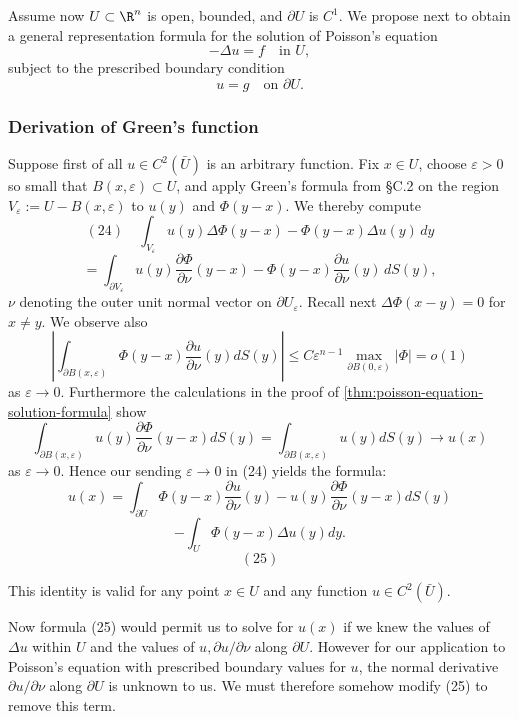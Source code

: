 Assume now $U \subset \R^n$ is open, bounded, and $\partial U$ is $C^1$. We propose next to obtain a general representation formula for the solution of Poisson's equation
$$-\Delta u = f \quad \text{in } U,$$
subject to the prescribed boundary condition
$$u = g \quad \text{on } \partial U.$$

\subsubsection{Derivation of Green's function}
\label{sec:laplace-greens-function-derivation}

Suppose first of all $u \in C^2(\bar{U})$ is an arbitrary function. Fix $x \in U$, choose $\varepsilon > 0$ so small that $B(x, \varepsilon) \subset U$, and apply Green's formula from \S C.2 on the region $V_\varepsilon := U - B(x, \varepsilon)$ to $u(y)$ and $\Phi(y - x)$. We thereby compute
$$(24) \quad \int_{V_\varepsilon} u(y) \Delta \Phi(y - x) - \Phi(y - x) \Delta u(y) \, dy$$
$$= \int_{\partial V_\varepsilon} u(y) \frac{\partial \Phi}{\partial \nu}(y - x) - \Phi(y - x) \frac{\partial u}{\partial \nu}(y) \, dS(y),$$
$\nu$ denoting the outer unit normal vector on $\partial U_\varepsilon$. Recall next $\Delta \Phi(x - y) = 0$ for $x \neq y$. We observe also
$$\left|\int_{\partial B(x,\varepsilon)} \Phi(y - x) \frac{\partial u}{\partial \nu}(y) dS(y)\right| \leq C\varepsilon^{n-1} \max_{\partial B(0,\varepsilon)} |\Phi| = o(1)$$
as $\varepsilon \to 0$. Furthermore the calculations in the proof of \cref{thm:poisson-equation-solution-formula} show
$$\int_{\partial B(x,\varepsilon)} u(y) \frac{\partial \Phi}{\partial \nu}(y - x) dS(y) = \int_{\partial B(x,\varepsilon)} u(y) dS(y) \to u(x)$$
as $\varepsilon \to 0$. Hence our sending $\varepsilon \to 0$ in (24) yields the formula:
$$u(x) = \int_{\partial U} \Phi(y - x) \frac{\partial u}{\partial \nu}(y) - u(y) \frac{\partial \Phi}{\partial \nu}(y - x) dS(y)$$
$$- \int_U \Phi(y - x) \Delta u(y) dy.$$
$$(25)$$

This identity is valid for any point $x \in U$ and any function $u \in C^2(\bar{U})$.

Now formula (25) would permit us to solve for $u(x)$ if we knew the values of $\Delta u$ within $U$ and the values of $u, \partial u/\partial \nu$ along $\partial U$. However for our application to Poisson's equation with prescribed boundary values for $u$, the normal derivative $\partial u/\partial \nu$ along $\partial U$ is unknown to us. We must therefore somehow modify (25) to remove this term.

